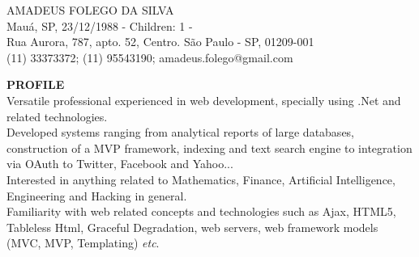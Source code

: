 \documentclass[11pt]{article}
\begin{document}
\begin{center}
 {\Large    AMADEUS FOLEGO DA SILVA}
\\
{\scriptsize 
\textborn Mauá, SP, 23/12/1988 - Children: 1 - \textmarried \\
Rua Aurora, 787, apto. 52, Centro. São Paulo - SP, 01209-001 \\
(11) 33373372;  (11) 95543190;  amadeus.folego@gmail.com\\}
\end{center}

\hspace{-.29in}
 {\bf  PROFILE }\\[.1in]
 \indent Versatile professional experienced in web development, specially using .Net and related technologies. \\
 \indent Developed systems ranging from analytical reports of large databases, construction of a MVP framework, indexing and text search engine to integration via OAuth to Twitter, Facebook and Yahoo...\\
 \indent Interested in anything related to Mathematics, Finance, Artificial Intelligence, Engineering and Hacking in general.\\
 \indent Familiarity with web related concepts and technologies such as Ajax, HTML5, Tableless Html, Graceful Degradation, web servers, web framework models (MVC, MVP, Templating) \textit{etc}.\\
 
\end{document}
